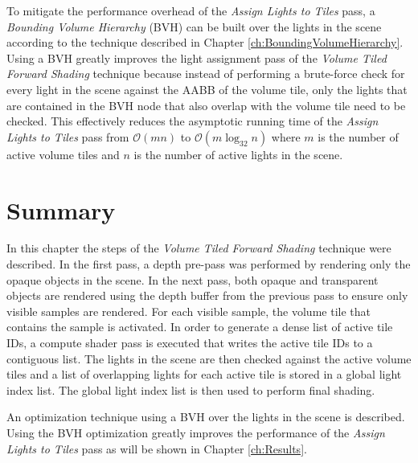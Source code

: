 To mitigate the performance overhead of the \emph{Assign Lights to Tiles} pass, a \emph{Bounding Volume Hierarchy} (BVH) can be built over the lights in the scene according to the technique described in Chapter \ref{ch:BoundingVolumeHierarchy}. Using a BVH greatly improves the light assignment pass of the \emph{Volume Tiled Forward Shading} technique because instead of performing a brute-force check for every light in the scene against the AABB of the volume tile, only the lights that are contained in the BVH node that also overlap with the volume tile need to be checked. This effectively reduces the asymptotic running time of the \emph{Assign Lights to Tiles} pass from $\mathcal{O}(mn)$ to $\mathcal{O}(m\log_{32}n)$ where $m$ is the number of active volume tiles and $n$ is the number of active lights in the scene.

\section{Summary}

In this chapter the steps of the \emph{Volume Tiled Forward Shading} technique were described. In the first pass, a depth pre-pass was performed by rendering only the opaque objects in the scene. In the next pass, both opaque and transparent objects are rendered using the depth buffer from the previous pass to ensure only visible samples are rendered. For each visible sample, the volume tile that contains the sample is activated. In order to generate a dense list of active tile IDs, a compute shader pass is executed that writes the active tile IDs to a contiguous list. The lights in the scene are then checked against the active volume tiles and a list of overlapping lights for each active tile is stored in a global light index list. The global light index list is then used to perform final shading.

An optimization technique using a BVH over the lights in the scene is described. Using the BVH optimization greatly improves the performance of the \emph{Assign Lights to Tiles} pass as will be shown in Chapter \ref{ch:Results}.

